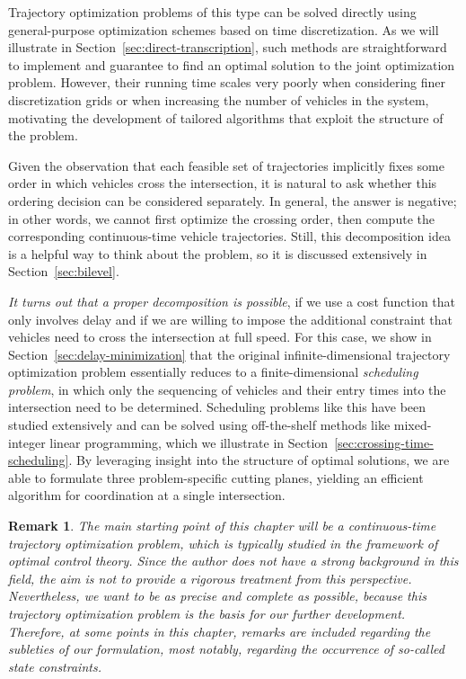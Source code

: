\documentclass[a4paper]{report}
\theoremstyle{definition}
\theoremstyle{plain}
\newtheorem*{remark}{Remark}
\begin{document}
Trajectory optimization problems of this type can be solved directly using
general-purpose optimization schemes based on time discretization.
%
As we will illustrate in Section~\ref{sec:direct-transcription}, such methods
are straightforward to implement and guarantee to find an optimal solution to
the joint optimization problem. However, their running time scales very poorly
when considering finer discretization grids or when increasing the number of
vehicles in the system, motivating the development of tailored algorithms that
exploit the structure of the problem.

Given the observation that each feasible set of trajectories implicitly fixes
some order in which vehicles cross the intersection, it is natural to ask
whether this ordering decision can be considered separately.
%
In general, the answer is negative; in other words, we cannot first optimize the
crossing order, then compute the corresponding continuous-time vehicle
trajectories.
%
Still, this decomposition idea is a helpful way to think about the problem, so
it is discussed extensively in Section~\ref{sec:bilevel}.

\emph{It turns out that a proper decomposition is possible}, if we use a cost
function that only involves delay and if we are willing to impose the additional
constraint that vehicles need to cross the intersection at full speed. For this
case, we show in Section~\ref{sec:delay-minimization} that the original
infinite-dimensional trajectory optimization problem essentially reduces to a
finite-dimensional \emph{scheduling problem}, in which only the sequencing of
vehicles and their entry times into the intersection need to be determined.
%
Scheduling problems like this have been studied extensively and can be solved
using off-the-shelf methods like mixed-integer linear programming, which we
illustrate in Section~\ref{sec:crossing-time-scheduling}.
%
By leveraging insight into the structure of optimal solutions, we are able to
formulate three problem-specific cutting planes, yielding an efficient
algorithm for coordination at a single intersection.

\begin{remark}
  The main starting point of this chapter will be a continuous-time trajectory
  optimization problem, which is typically studied in the framework of optimal
  control theory. Since the author does not have a strong background in this
  field, the aim is not to provide a rigorous treatment from this perspective.
  Nevertheless, we want to be as precise and complete as possible, because this
  trajectory optimization problem is the basis for our further development.
  Therefore, at some points in this chapter, remarks are included regarding the
  subleties of our formulation, most notably, regarding the occurrence of
  so-called state constraints.
\end{remark}
\end{document}
